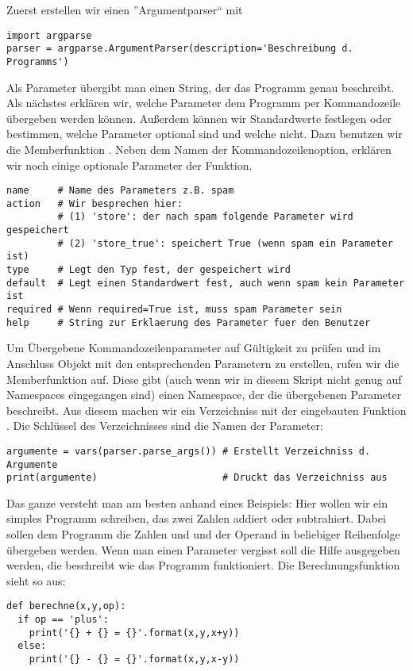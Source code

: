 Zuerst erstellen wir einen ''Argumentparser`` mit
\begin{lstlisting}
import argparse
parser = argparse.ArgumentParser(description='Beschreibung d. Programms')
\end{lstlisting}
Als Parameter  übergibt man einen String, der das Programm genau beschreibt.
Als nächstes erklären wir, welche Parameter dem Programm per Kommandozeile übergeben werden können.
Außerdem können wir Standardwerte festlegen oder bestimmen, welche Parameter optional sind und welche nicht.
Dazu benutzen wir die Memberfunktion .
Neben dem Namen der Kommandozeilenoption, erklären wir noch einige optionale Parameter der Funktion.
\begin{lstlisting}
name     # Name des Parameters z.B. spam
action   # Wir besprechen hier:
         # (1) 'store': der nach spam folgende Parameter wird gespeichert
         # (2) 'store_true': speichert True (wenn spam ein Parameter ist)
type     # Legt den Typ fest, der gespeichert wird
default  # Legt einen Standardwert fest, auch wenn spam kein Parameter ist
required # Wenn required=True ist, muss spam Parameter sein
help     # String zur Erklaerung des Parameter fuer den Benutzer
\end{lstlisting}
Um Übergebene Kommandozeilenparameter auf Gültigkeit zu prüfen und im Anschluss Objekt mit den entsprechenden Parametern zu erstellen, rufen wir die Memberfunktion  auf.
Diese gibt (auch wenn wir in diesem Skript nicht genug auf Namespaces eingegangen sind) einen Namespace, der die übergebenen Parameter beschreibt.
Aus diesem machen wir ein Verzeichniss mit der eingebauten Funktion .
Die Schlüssel des Verzeichnisses sind die Namen der Parameter:
\begin{lstlisting}
argumente = vars(parser.parse_args()) # Erstellt Verzeichniss d. Argumente
print(argumente)                      # Druckt das Verzeichniss aus
\end{lstlisting}
Das ganze versteht man am besten anhand eines Beispiels:
Hier wollen wir ein simples Programm schreiben, das zwei Zahlen addiert oder subtrahiert.
Dabei sollen dem Programm die Zahlen  und  und der Operand  in beliebiger Reihenfolge übergeben werden.
Wenn man einen Parameter vergisst soll die Hilfe ausgegeben werden, die beschreibt wie das Programm funktioniert.
Die Berechnungsfunktion sieht so aus:
\begin{lstlisting}
def berechne(x,y,op):
  if op == 'plus':
    print('{} + {} = {}'.format(x,y,x+y))
  else:
    print('{} - {} = {}'.format(x,y,x-y))
\end{lstlisting}
